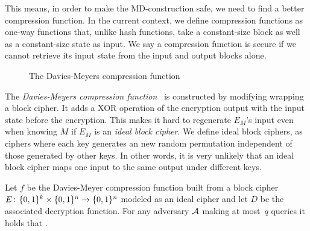 This means, in order to make the MD-construction safe, we need to find a better compression function.
In the current context, we define compression functions as one-way functions that, unlike hash functions, take a constant-size block as well as a constant-size state as input.
We say a compression function is secure if we cannot retrieve its input state from the input and output blocks alone.

\begin{figure}
\centering
\caption{The Davies-Meyers compression function}
\end{figure}

The \emph{Davies-Meyers compression function}~\cite{winternitz1984secure,black2002black} is constructed by modifying wrapping a block cipher.
It adds a XOR operation of the encryption output with the input state before the encryption.
This makes it hard to regenerate $E_M$'s input even when knowing $M$ if $E_M$ is an \emph{ideal block cipher}.
We define ideal block ciphers, as ciphers where each key generates an new random permutation independent of those generated by other keys.
In other words, it is very unlikely that an ideal block cipher maps one input to the same output under different keys.

\begin{theorem}
Let $f$ be the Davies-Meyer compression function built from a block cipher
$E{{\kern .05em}\colon{\kern .05em}}\{0,1\}^k\times\{0,1\}^n\rightarrow\{0,1\}^n$ modeled as an ideal
cipher and let $D$ be the associated decryption function.
For any adversary ${\mathcal A}$ making at most~$q$ queries it holds that
\bnm
   \le {} \;.
\enm
\end{theorem}

